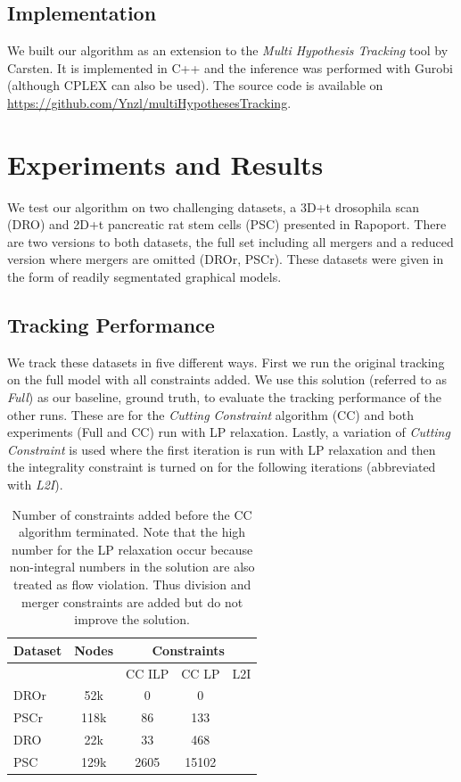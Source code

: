 \documentclass[10pt,twocolumn,letterpaper]{article}
\begin{document}
\subsection{Implementation}

We built our algorithm as an extension to the \textit{Multi Hypothesis Tracking} tool by Carsten. It is implemented in C++ and the inference was performed with Gurobi (although CPLEX can also be used). The source code is available on \url{https://github.com/Ynzl/multiHypothesesTracking}.

\section{Experiments and Results}

We test our algorithm on two challenging datasets, a 3D+t drosophila scan (DRO) and 2D+t pancreatic rat stem cells (PSC) presented in Rapoport. There are two versions to both datasets, the full set including all mergers and a reduced version where mergers are omitted (DROr, PSCr). These datasets were given in the form of readily segmentated graphical models.

\subsection{Tracking Performance}

We track these datasets in five different ways. First we run the original tracking on the full model with all constraints added. We use this solution (referred to as \textit{Full}) as our baseline, \ie ground truth, to evaluate the tracking performance of the other runs. These are for the \textit{Cutting Constraint} algorithm (CC) and both experiments (Full and CC) run with LP relaxation. Lastly, a variation of \textit{Cutting Constraint} is used where the first iteration is run with LP relaxation and then the integrality constraint is turned on for the following iterations (abbreviated with \textit{L2I}).

\begin{table}
  \begin{center}
  \begin{tabular}{|l|c||c|c|c|}
    \hline
    Dataset & Nodes & \multicolumn{3}{|c|}{Constraints}\\
    \hline\hline
            &       & CC ILP & CC LP & L2I\\
    \hline
    DROr & 52k & 0 & 0 & \\
    PSCr & 118k & 86 & 133 & \\
    DRO & 22k & 33 & 468 & \\
    PSC & 129k & 2605 & 15102 & \\
    \hline
  \end{tabular}
  \end{center}
  \caption{Number of constraints added before the CC algorithm terminated. Note that the high number for the LP relaxation occur because non-integral numbers in the solution are also treated as flow violation. Thus division and merger constraints are added but do not improve the solution.}
  \label{tab:constraints}
\end{table}
\end{document}

